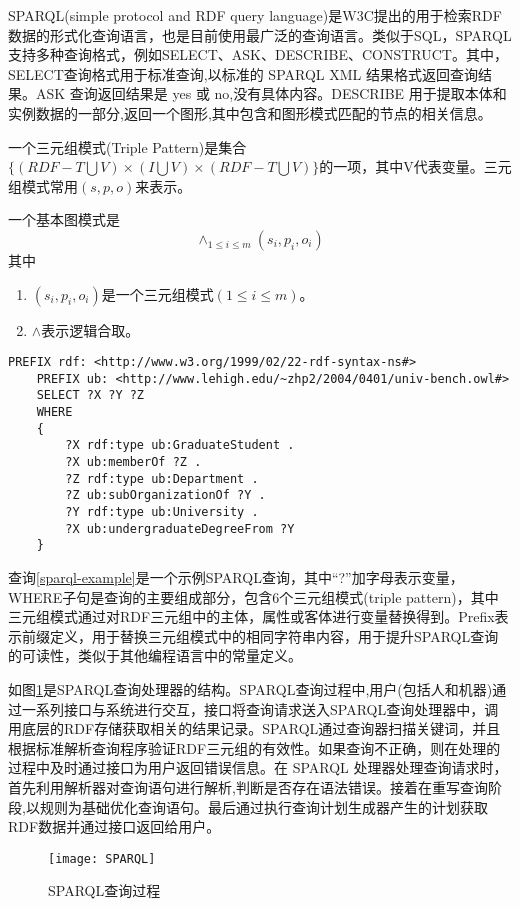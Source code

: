 SPARQL(simple protocol and RDF query language)是W3C提出的用于检索RDF数据的形式化查询语言，也是目前使用最广泛的查询语言。类似于SQL，SPARQL支持多种查询格式，例如SELECT、ASK、DESCRIBE、CONSTRUCT。其中，SELECT查询格式用于标准查询,以标准的 SPARQL XML 结果格式返回查询结果。ASK 查询返回结果是 yes 或 no,没有具体内容。DESCRIBE 用于提取本体和实例数据的一部分,返回一个图形,其中包含和图形模式匹配的节点的相关信息。
\begin{definition}[（三元组模式）] 
    \label{Triple}   
    一个三元组模式(Triple Pattern)是集合$\lbrace (RDF-T \bigcup V)\times(I \bigcup V)\times(RDF-T \bigcup V)\rbrace$的一项，其中V代表变量。三元组模式常用$(s,p,o)$来表示。
\end{definition}
\begin{definition}    
    \label{BGP}
    一个基本图模式是$$\wedge_{1\leqslant i\leqslant m}(s_i,p_i,o_i)$$
    其中
    \begin{enumerate}
        \item $(s_i,p_i,o_i)$是一个三元组模式$(1 \leqslant  i \leqslant m)$。
        \item $\wedge$表示逻辑合取。
    \end{enumerate}
    
\end{definition}

\begin{lstlisting}[caption={SPARQL查询语句},label={sparql-example}]
    PREFIX rdf: <http://www.w3.org/1999/02/22-rdf-syntax-ns#>
    PREFIX ub: <http://www.lehigh.edu/~zhp2/2004/0401/univ-bench.owl#>
    SELECT ?X ?Y ?Z
    WHERE
    {
        ?X rdf:type ub:GraduateStudent .  
        ?X ub:memberOf ?Z .               
        ?Z rdf:type ub:Department .       
        ?Z ub:subOrganizationOf ?Y .      
        ?Y rdf:type ub:University .       
        ?X ub:undergraduateDegreeFrom ?Y  
    }
\end{lstlisting}
查询\ref{sparql-example}是一个示例SPARQL查询，其中“?”加字母表示变量，WHERE子句是查询的主要组成部分，包含6个三元组模式(triple pattern)，其中三元组模式通过对RDF三元组中的主体，属性或客体进行变量替换得到。Prefix表示前缀定义，用于替换三元组模式中的相同字符串内容，用于提升SPARQL查询的可读性，类似于其他编程语言中的常量定义。

如图\ref{SPARQL查询过程}是SPARQL查询处理器的结构。SPARQL查询过程中,用户(包括人和机器)通过一系列接口与系统进行交互，接口将查询请求送入SPARQL查询处理器中，调用底层的RDF存储获取相关的结果记录。SPARQL通过查询器扫描关键词，并且根据标准解析查询程序验证RDF三元组的有效性。如果查询不正确，则在处理的过程中及时通过接口为用户返回错误信息。在 SPARQL 处理器处理查询请求时，首先利用解析器对查询语句进行解析,判断是否存在语法错误。接着在重写查询阶段,以规则为基础优化查询语句。最后通过执行查询计划生成器产生的计划获取RDF数据并通过接口返回给用户。
\begin{figure}[h]
\centering
\texttt{[image: SPARQL]}
\caption{SPARQL查询过程}
\label{SPARQL查询过程}
\end{figure}

